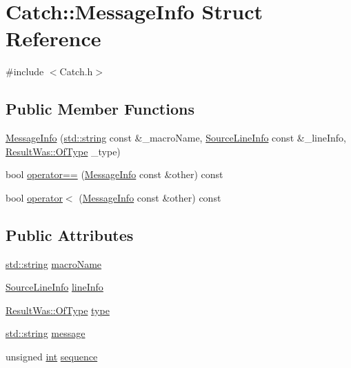 \hypertarget{struct_catch_1_1_message_info}{}\section{Catch\+:\+:Message\+Info Struct Reference}
\label{struct_catch_1_1_message_info}


{\ttfamily \#include $<$Catch.\+h$>$}

\subsection*{Public Member Functions}
\begin{DoxyCompactItemize}
\item 
\hyperlink{struct_catch_1_1_message_info_a2e336c33ebef7af3c1bbae6a56e14f8a}{Message\+Info} (\hyperlink{_s_d_l__opengl__glext_8h_ae84541b4f3d8e1ea24ec0f466a8c568b}{std\+::string} const \&\+\_\+macro\+Name, \hyperlink{struct_catch_1_1_source_line_info}{Source\+Line\+Info} const \&\+\_\+line\+Info, \hyperlink{struct_catch_1_1_result_was_a624e1ee3661fcf6094ceef1f654601ef}{Result\+Was\+::\+Of\+Type} \+\_\+type)
\item 
bool \hyperlink{struct_catch_1_1_message_info_a30fe117138e568c5a9dfdabb7de6e790}{operator==} (\hyperlink{struct_catch_1_1_message_info}{Message\+Info} const \&other) const 
\item 
bool \hyperlink{struct_catch_1_1_message_info_a7a2b1ec3772cd35176e2ee25a94be16a}{operator$<$} (\hyperlink{struct_catch_1_1_message_info}{Message\+Info} const \&other) const 
\end{DoxyCompactItemize}
\subsection*{Public Attributes}
\begin{DoxyCompactItemize}
\item 
\hyperlink{_s_d_l__opengl__glext_8h_ae84541b4f3d8e1ea24ec0f466a8c568b}{std\+::string} \hyperlink{struct_catch_1_1_message_info_a156ade4b3cc731f6ec7b542ae47ba8e3}{macro\+Name}
\item 
\hyperlink{struct_catch_1_1_source_line_info}{Source\+Line\+Info} \hyperlink{struct_catch_1_1_message_info_a985165328723e599696ebd8e43195cc5}{line\+Info}
\item 
\hyperlink{struct_catch_1_1_result_was_a624e1ee3661fcf6094ceef1f654601ef}{Result\+Was\+::\+Of\+Type} \hyperlink{struct_catch_1_1_message_info_ae928b9117465c696e45951d9d0284e78}{type}
\item 
\hyperlink{_s_d_l__opengl__glext_8h_ae84541b4f3d8e1ea24ec0f466a8c568b}{std\+::string} \hyperlink{struct_catch_1_1_message_info_ab6cd06e050bf426c6577502a5c50e256}{message}
\item 
unsigned \hyperlink{_s_d_l__thread_8h_a6a64f9be4433e4de6e2f2f548cf3c08e}{int} \hyperlink{struct_catch_1_1_message_info_a7f4f57ea21e50160adefce7b68a781d6}{sequence}
\end{DoxyCompactItemize}


